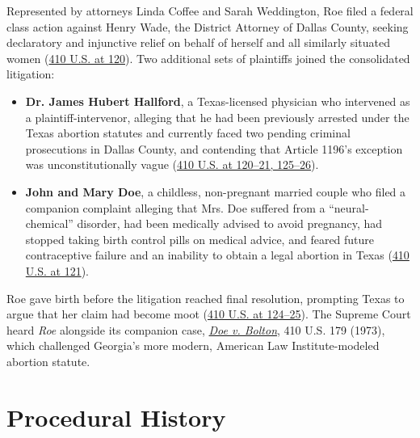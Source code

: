 \documentclass[12pt]{article}
\begin{document}
Represented by attorneys Linda Coffee and Sarah Weddington, Roe filed a federal class action against Henry Wade, the District Attorney of Dallas County, seeking declaratory and injunctive relief on behalf of herself and all similarly situated women (\href{https://supreme.justia.com/cases/federal/us/410/113/}{410 U.S. at 120}). Two additional sets of plaintiffs joined the consolidated litigation:
\begin{itemize}
\item \textbf{Dr. James Hubert Hallford}, a Texas-licensed physician who intervened as a plaintiff-intervenor, alleging that he had been previously arrested under the Texas abortion statutes and currently faced two pending criminal prosecutions in Dallas County, and contending that Article 1196's exception was unconstitutionally vague (\href{https://supreme.justia.com/cases/federal/us/410/113/}{410 U.S. at 120--21, 125--26}).
\item \textbf{John and Mary Doe}, a childless, non-pregnant married couple who filed a companion complaint alleging that Mrs. Doe suffered from a ``neural-chemical'' disorder, had been medically advised to avoid pregnancy, had stopped taking birth control pills on medical advice, and feared future contraceptive failure and an inability to obtain a legal abortion in Texas (\href{https://supreme.justia.com/cases/federal/us/410/113/}{410 U.S. at 121}).
\end{itemize}

Roe gave birth before the litigation reached final resolution, prompting Texas to argue that her claim had become moot (\href{https://supreme.justia.com/cases/federal/us/410/113/}{410 U.S. at 124--25}). The Supreme Court heard \textit{Roe} alongside its companion case, \href{https://supreme.justia.com/cases/federal/us/410/179/}{\textit{Doe v. Bolton}}, 410 U.S. 179 (1973), which challenged Georgia's more modern, American Law Institute-modeled abortion statute.

\section{Procedural History}
\end{document}
